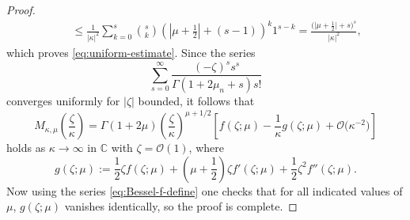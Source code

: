 \documentclass[11pt]{article}
\numberwithin{equation}{section}
\numberwithin{equation}{section}
\begin{document}
\begin{proof}
\begin{gather*}
 \qquad\le \frac{1}{|\kappa|^2}\sum_{k=0}^s\binom{s}{k}\left(\left|\mu+\frac{1}{2}\right|+(s-1)\right)^k1^{s-k}=\frac{\big(\big|\mu+\frac{1}{2}\big|+s\big)^s}{|\kappa|^2},
\end{gather*}
which proves \eqref{eq:uniform-estimate}.
Since the series
\begin{equation*}%
 \sum_{s=0}^\infty \frac{(-\zeta)^ss^s}{\Gamma(1+2\mu_n+s)s!}
\end{equation*}
converges uniformly for $|\zeta|$ bounded, it follows that
\begin{equation*}%
 M_{\kappa,\mu}\left(\frac{\zeta}{\kappa}\right) = \Gamma(1+2\mu)\left(\frac{\zeta}{\kappa}\right)^{\mu+1/2}\left[f(\zeta;\mu) -\frac{1}{\kappa}g(\zeta;\mu) + \mathcal{O}\big(\kappa^{-2}\big)\right]
\end{equation*}
holds as $\kappa\to\infty$ in $\mathbb{C}$ with $\zeta=\mathcal{O}(1)$, where
\begin{equation*}%
 g(\zeta;\mu):=\frac{1}{2}\zeta f(\zeta;\mu)+\left(\mu+\frac{1}{2}\right)\zeta f'(\zeta;\mu) +\frac{1}{2}\zeta^2f''(\zeta;\mu).
\end{equation*}
Now using the series \eqref{eq:Bessel-f-define} one checks that for all indicated values of $\mu$, $g(\zeta;\mu)$ vanishes identically, so the proof is complete.
\end{proof}
\end{document}

